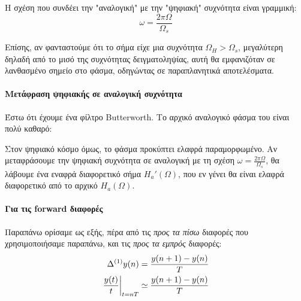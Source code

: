 \documentclass[11pt,a4paper,notitlepage,fleqn,draft]{article}
\begin{document}
Η σχέση που συνδέει την "αναλογική" με την "ψηφιακή" συχνότητα είναι γραμμική:
\[
\boxed{\omega = \frac{2πΩ}{Ω_s}}
\]

Επίσης, αν φανταστούμε ότι το σήμα είχε μια συχνότητα \( Ω_H > \Omega_s \), μεγαλύτερη δηλαδή από το
μισό της συχνότητας δειγματοληψίας, αυτή θα εμφανιζόταν σε λανθασμένο σημείο στο φάσμα, οδηγώντας
σε παραπλανητικά αποτελέσματα.

\paragraph{Μετάφραση ψηφιακής σε αναλογική συχνότητα}
Έστω ότι έχουμε ένα φίλτρο Butterworth. Το αρχικό αναλογικό φάσμα του είναι πολύ καθαρό:


Στον ψηφιακό κόσμο όμως, το φάσμα προκύπτει ελαφρά παραμορφωμένο. Αν μεταφράσουμε την ψηφιακή συχνότητα
σε αναλογική με τη σχέση \( ω = \frac{2πΩ}{Ω_s} \), θα λάβουμε ένα εναφρά διαφορετικό σήμα \( H_a'(Ω) \),
που εν γένει θα είναι ελαφρά διαφορετικό από το αρχικό \( H_a(Ω) \).

\paragraph{Για τις forward διαφορές}
Παραπάνω ορίσαμε ως εξής, πέρα από τις \emph{προς τα πίσω} διαφορές που χρησιμοποιήσαμε παραπάνω,
και τις \emph{προς τα εμπρός} διαφορές:
\begin{align*}
\Delta^{(1)} y(n) &= \frac{y(n+1)-y(n)}{T} \\
\left. \frac{y(t)}{t} \right|_{t=nT} &\simeq \frac{y(n+1)-y(n)}{T}
\end{align*}
\end{document}
